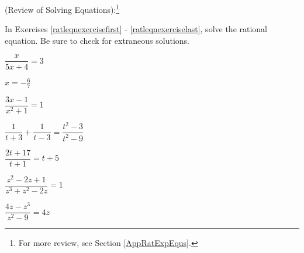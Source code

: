\documentclass{ximera}
\begin{document}
	\author{Stitz-Zeager}


\begin{question}
(Review of Solving Equations):\footnote{For more review, see Section \ref{AppRatExpEqus}.} 

In Exercises \ref{ratleqnexercisefirst} - \ref{ratleqnexerciselast},  solve the rational equation.  Be sure to check for extraneous solutions.

\begin{problem}\label{ratleqnexercisefirst}
$\dfrac{x}{5x + 4} = 3$ 

\begin{solution}
$x = -\frac{6}{7}$
\end{solution}
\end{problem}

\begin{problem}
$\dfrac{3x - 1}{x^{2} + 1} = 1$ 
\end{problem} 

\begin{problem}
$\dfrac{1}{t + 3} + \dfrac{1}{t - 3} = \dfrac{t^{2} - 3}{t^{2} - 9}$ 
\end{problem} 

\begin{problem}
$\dfrac{2t + 17}{t + 1} = t + 5$ 
\end{problem}  

\begin{problem}
$\dfrac{z^{2} - 2z + 1}{z^{3} + z^{2} - 2z} = 1$ 
\end{problem}   

\begin{problem}\label{ratleqnexerciselast}
$\dfrac{4z- z^3}{z^{2} - 9} = 4z$  
\end{problem}  

\end{question}
\end{document}
